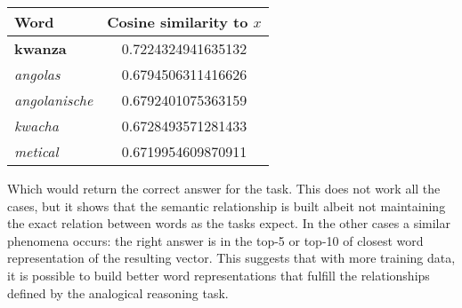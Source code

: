 \begin{center}
\small
\begin{tabular}{|l|c|}
 \hline
 Word                 &  Cosine similarity to $x$  \\
\hline
\textbf{kwanza}        &        0.7224324941635132  \\
 \emph{angolas}       &        0.6794506311416626  \\
 \emph{angolanische}  &        0.6792401075363159  \\
 \emph{kwacha}        &        0.6728493571281433  \\
 \emph{metical}       &        0.6719954609870911  \\
\hline
\end{tabular}
\end{center}

Which would return the correct answer for the task. This does not work all
the cases, but it shows that the semantic relationship is built albeit not
maintaining the exact relation between words as the tasks expect. In the
other cases  a similar phenomena occurs: the right answer is in the
top-5 or top-10 of closest word representation  of  the resulting vector. This suggests 
that with more training data, it is possible to build better word
representations  that fulfill the relationships defined  by the analogical
reasoning task.



